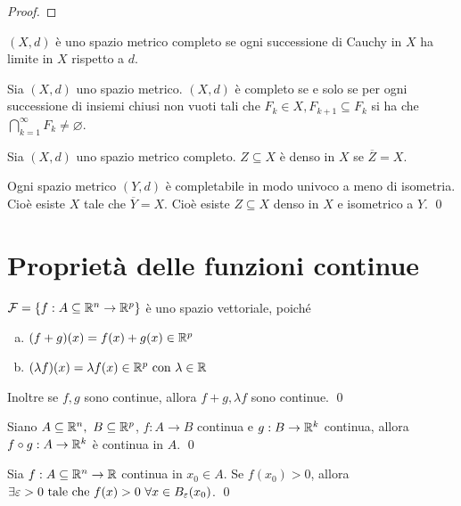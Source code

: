 \begin{proof}
\end{proof}

\begin{definition}
    $(X, d)$ è uno spazio metrico completo se ogni successione di Cauchy in $X$ ha limite in $X$ rispetto a $d$.
\end{definition}

\begin{theorem}
    Sia $(X,d)$ uno spazio metrico. $(X,d)$ è completo se e solo se per ogni successione di insiemi chiusi non vuoti tali che $F_k \in X, F_{k+1}\subseteq F_k$ si ha che $\bigcap\limits_{k=1}^{\infty}F_k\neq\varnothing$.
\end{theorem}

\begin{definition}
    Sia $(X,d)$ uno spazio metrico completo. $Z \subseteq X$ è denso in $X$ se $\overline{Z} = X$.
\end{definition}

\begin{theorem}
    Ogni spazio metrico $(Y,d)$ è completabile in modo univoco a meno di isometria. Cioè esiste $X$ tale che $\overline{Y} = X$. Cioè esiste $Z \subseteq X$ denso in $X$ e isometrico a $Y$.
    \qed
\end{theorem}

\section{Proprietà delle funzioni continue}

\begin{theorem}
    $\mathcal{F}=\{f: A \subseteq \mathbb{R}^n \to \mathbb{R}^p\}$ è uno spazio vettoriale, poiché
    \begin{enumerate}[a.]
        \item $(f+g)(x)=f(x)+g(x) \in \mathbb{R}^p$
        \item $(\lambda f)(x)= \lambda f(x) \in \mathbb{R}^p \text{ con } \lambda \in \mathbb{R}$
    \end{enumerate}
    Inoltre se $f,g$ sono continue, allora $f+g, \lambda f$ sono continue.
    \qed
\end{theorem}

\begin{theorem}
    Siano $A \subseteq \mathbb{R}^n, \ B \subseteq \mathbb{R}^p$, $f: A \to B$ continua e $g: B \to \mathbb{R}^k$ continua, allora $f\circ g: A \to \mathbb{R}^k$ è continua in $A$.
    \qed
\end{theorem}

\begin{theorem}
    Sia $f: A \subseteq \mathbb{R}^n \to \mathbb{R}$ continua in $x_0 \in A$. Se $f(x_0)>0$, allora $\exists \varepsilon > 0 \text{ tale che } f(x) > 0 \ \forall x \in B_\varepsilon(x_0)$.
    \qed
\end{theorem}